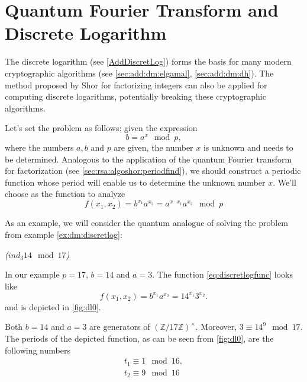 \section{Quantum Fourier Transform and Discrete Logarithm}

The discrete logarithm (see \autoref{AddDiscretLog}) forms the basis for many modern cryptographic algorithms (see \autoref{sec:add:dm:elgamal}, \autoref{sec:add:dm:dh}). The method proposed by Shor for factorizing integers can also be applied for computing discrete logarithms, potentially breaking these cryptographic algorithms.

Let's set the problem as follows: given the expression
\[
b = a^x \mod p,
\]
where the numbers $a, b$ and $p$ are given, the number $x$ is unknown and needs to be determined. Analogous to the application of the quantum Fourier transform for factorization (see \autoref{sec:rsa:algoshor:periodfind}), we should construct a periodic function whose period will enable us to determine the unknown number $x$. We'll choose as the function to analyze
\begin{equation}
f\left(x_1, x_2\right) = b^{x_1}a^{x_2} = a^{x \cdot x_1} a^{x_2} \mod p
\label{eq:discretlogfunc}
\end{equation}

As an example, we will consider the quantum analogue of solving the problem from example \ref{ex:dm:discretlog}:
\begin{example}
\emph{($ind_3{14} \mod{17}$)}

In our example $p = 17$, $b = 14$ and $a = 3$. The function \eqref{eq:discretlogfunc} looks like
\[
f\left(x_1, x_2\right) = b^{x_1}a^{x_2} = 14^{x_1}3^{x_2}.
\]
and is depicted in \autoref{fig:dl0}.

Both $b=14$ and $a=3$ are generators of $\left(\mathbb{Z}/17\mathbb{Z}\right)^\times$. Moreover, $3 \equiv 14^9 \mod 17$. The periods of the depicted function, as can be seen from \autoref{fig:dl0}, are the following numbers
\begin{eqnarray}
t_1 \equiv 1 \mod 16,
\nonumber \\
t_2 \equiv 9 \mod 16
\end{eqnarray} 
\label{ex:discretlog:periodfinding0}
\end{example}

